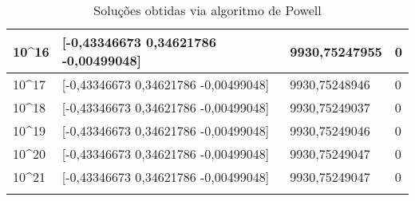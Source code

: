 \documentclass{article}
\begin{document}
\begin{longtable}[c]{|l|l|l|l|}
10\textasciicircum{}16 & {[}-0,43346673  0,34621786 -0,00499048{]} & 9930,75247955  & 0             \\ \hline
10\textasciicircum{}17 & {[}-0,43346673  0,34621786 -0,00499048{]} & 9930,75248946  & 0             \\ \hline
10\textasciicircum{}18 & {[}-0,43346673  0,34621786 -0,00499048{]} & 9930,75249037  & 0             \\ \hline
10\textasciicircum{}19 & {[}-0,43346673  0,34621786 -0,00499048{]} & 9930,75249046  & 0             \\ \hline
10\textasciicircum{}20 & {[}-0,43346673  0,34621786 -0,00499048{]} & 9930,75249047  & 0             \\ \hline
10\textasciicircum{}21 & {[}-0,43346673  0,34621786 -0,00499048{]} & 9930,75249047  & 0             \\ \hline
\caption{Soluções obtidas via algoritmo de Powell}
\label{tab:powell-p2}\\
\end{longtable}
\end{document}
